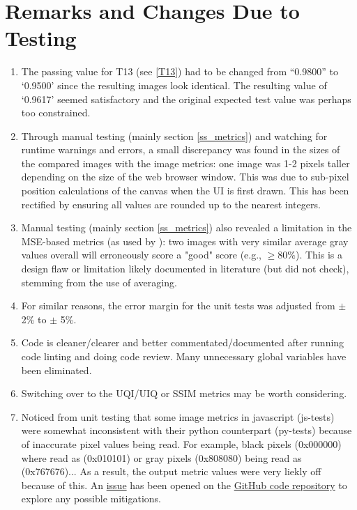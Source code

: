\documentclass[12pt, titlepage]{article}
\begin{document}
\section{Remarks and Changes Due to Testing}
\begin{enumerate}
  \item The passing value for T13 (see \ref{T13}) had to be changed from ``0.9800'' to `0.9500' since the
    resulting images look identical. The resulting value of `0.9617' seemed satisfactory and the original
    expected test value was perhaps too constrained.
  \item Through manual testing (mainly section \ref{ss_metrics})
    and watching for runtime warnings and errors,
    a small discrepancy was found in the sizes of the compared images with
    the image metrics: one image was 1-2 pixels taller depending on the size
    of the web browser window. This was due to sub-pixel position calculations
    of the canvas when the UI is first drawn. This has been rectified by
    ensuring all values are rounded up to the nearest integers.
  \item Manual testing (mainly section \ref{ss_metrics}) also
    revealed a limitation in the MSE-based metrics (as used by \progname{}):
    two images with very similar average gray values overall will
    erroneously score a "good" score (e.g., $\ge 80\%$). This is a design
    flaw or limitation likely documented in literature (but did not check),
    stemming from the use of averaging.
  \item For similar reasons, the error margin for the unit tests was adjusted from $\pm$ 2\% to $\pm$ 5\%.
  \item Code is cleaner/clearer and better commentated/documented after running code linting and
    doing code review. Many unnecessary global variables have been eliminated.
  \item Switching over to the UQI/UIQ or SSIM metrics may be worth considering.
  \item Noticed from unit testing that some image metrics in javascript (js-tests) were somewhat
    inconsistent with their python counterpart (py-tests) because of inaccurate pixel values being read. For example,
    black pixels (0x000000) where read as (0x010101) or gray pixels (0x808080) being
    read as (0x767676)... As a result, the output metric values were very liekly
    off because of this. An \href{https://github.com/joedf/ImgBeamer/issues/25}{issue}
    has been opened on the \href{https://github.com/joedf/ImgBeamer}{GitHub code repository}
    to explore any possible mitigations.
\end{enumerate}
\end{document}
